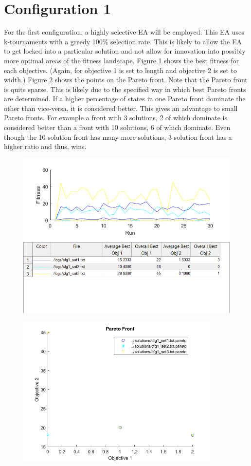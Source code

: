 \documentclass[11pt]{article}
\begin{document}
\section{Configuration 1}\label{sect:cfg1}
For the first configuration, a highly selective EA will be employed. This EA uses k-tournaments with a greedy 100\% selection rate. This is likely to allow the EA to get locked into a particular solution and not allow for innovation into possibly more optimal areas of the fitness landscape.
Figure \ref{fig:cfg1_best} shows the best fitness for each objective. (Again, for objective 1 is set to length and objective 2 is set to width.) Figure \ref{fig:cfg1_pareto} shows the points on the Pareto front. Note that the Pareto front is quite sparse. This is likely due to the specified way in which best Pareto fronts are determined. If a higher percentage of states in one Pareto front dominate the other than vice-versa, it is considered better. This gives an advantage to small Pareto fronts. For example a front with 3 solutions, 2 of which dominate is considered better than a front with 10 solutions, 6 of which dominate. Even though the 10 solution front has many more solutions, 3 solution front has a higher ratio and thus, wins.
\begin{figure}[h]
	\centering
  \includegraphics[width=5in]{assn1d_cfg1_bestfitness.png}
  \label{fig:cfg1_best}
\end{figure}
\begin{figure}[h]
	\centering
  \includegraphics[width=4in]{assn1d_cfg1_pareto.png}
  \label{fig:cfg1_pareto}
\end{figure}
\end{document}
